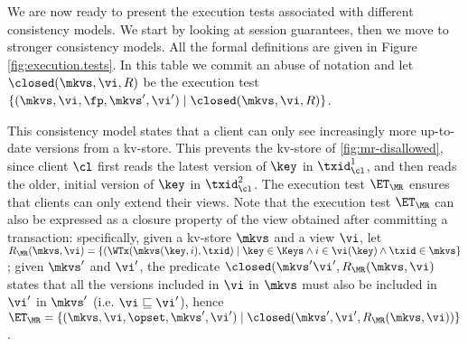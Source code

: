 We are now ready to present the execution tests  associated with different consistency models. 
We start by looking at session guarantees, then we move to stronger consistency models. 
All the formal definitions are given in Figure \ref{fig:execution.tests}. In this table we 
commit an abuse of notation and let $\closed(\mkvs, \vi, R)$ be the execution test 
$\{(\mkvs, \vi, \fp, \mkvs', \vi') \mid \closed(\mkvs, \vi, R)\}$.


This consistency model states that a client
can only see increasingly more up-to-date versions from a kv-store. 
This prevents \eg the kv-store of \cref{fig:mr-disallowed},
since client $\cl$ first reads the latest version of $\key$ in $\txid_{\cl}^{1}$, 
and then reads the older, initial version of $\key$ in $\txid_{\cl}^{2}$.  
The execution test $\ET_{\MR}$ ensures that clients  can only extend their views. 
Note that the execution test $\ET_{\MR}$ can also be expressed as a closure 
property of the view obtained after committing a transaction: 
specifically, given a kv-store $\mkvs$ and a view $\vi$, let 
$R_{\MR}(\mkvs, \vi) = \{(\WTx(\mkvs(\key, i), \txid) \mid \key \in \Keys \wedge i \in \vi(\key) 
\wedge \txid \in \mkvs\}$; given $\mkvs'$ and $\vi'$, 
the predicate $\closed(\mkvs' \vi', R_{\MR}(\mkvs, \vi)$ states that all the versions included in $\vi$ in $\mkvs$ 
must also be included in $\vi'$ in $\mkvs'$ (i.e. $\vi \sqsubseteq \vi'$), hence 
$\ET_{\MR} = \{(\mkvs, \vi, \opset, \mkvs', \vi') \mid \closed(\mkvs', \vi', 
R_{\MR}(\mkvs, \vi))\}$.

